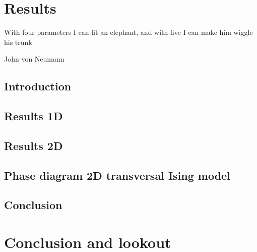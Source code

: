 \documentclass{book}
\newcounter{a}
\newcounter{b}
\begin{document}
\chapter{Results} \label{chap:results}

\epigraph{With four parameters I can fit an elephant, and with five I can make him wiggle his trunk}{John von Neumann}

%

\section{Introduction}


\section{Results 1D}\label{sec:results1d}


\section{Results 2D}\label{sec:results2d}


\section{Phase diagram 2D transversal Ising model} \label{subsec:2dpahsediag}


\section{Conclusion}


\chapter{Conclusion and lookout}






\clearpage{\thispagestyle{empty}\cleardoublepage}
\end{document}
